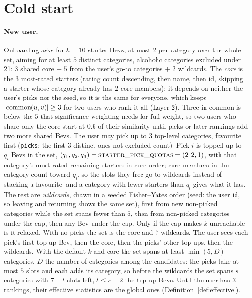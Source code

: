 \documentclass[11pt]{article}
\DeclarePairedDelimiter\abs{\lvert}{\rvert}
\newcommand{\code}[1]{\texttt{#1}}
\theoremstyle{plain}
\theoremstyle{definition}
\theoremstyle{remark}
\begin{document}
\section{Cold start}\label{sec:coldstart}

\paragraph{New user.} Onboarding asks for $k = 10$ starter Bevs, at most $2$ per category over the whole set, aiming for at least $5$ distinct categories, alcoholic categories excluded under 21: $3$ shared core $+$ $5$ from the user's go-to categories $+$ $2$ wildcards. The \emph{core} is the $3$ most-rated starters (rating count descending, then name, then id, skipping a starter whose category already has $2$ core members); it depends on neither the user's picks nor the seed, so it is the same for everyone, which keeps $\abs{\mathrm{common}(u,v)} \ge 3$ for two users who rank it all (Layer 2). Three in common is below the $5$ that significance weighting needs for full weight, so two users who share only the core start at $0.6$ of their similarity until picks or later rankings add two more shared Bevs. The user may pick up to $3$ top-level categories, favourite first (\code{picks}; the first $3$ distinct ones not excluded count). Pick $i$ is topped up to $q_i$ Bevs in the set, $(q_1, q_2, q_3) = \textsc{starter\_pick\_quotas} = (2, 2, 1)$, with that category's most-rated remaining starters in core order; core members in the category count toward $q_i$, so the slots they free go to wildcards instead of stacking a favourite, and a category with fewer starters than $q_i$ gives what it has. The rest are \emph{wildcards}, drawn in a seeded Fisher--Yates order (seed: the user id, so leaving and returning shows the same set), first from new non-picked categories while the set spans fewer than $5$, then from non-picked categories under the cap, then any Bev under the cap. Only if the cap makes $k$ unreachable is it relaxed. With no picks the set is the core and $7$ wildcards. The user sees each pick's first top-up Bev, then the core, then the picks' other top-ups, then the wildcards. With the default $k$ and core the set spans at least $\min(5, D)$ categories, $D$ the number of categories among the candidates: the picks take at most $5$ slots and each adds its category, so before the wildcards the set spans $s$ categories with $7 - t$ slots left, $t \le s + 2$ the top-up Bevs. Until the user has $3$ rankings, their effective statistics are the global ones (Definition~\ref{def:effective}).
\end{document}
